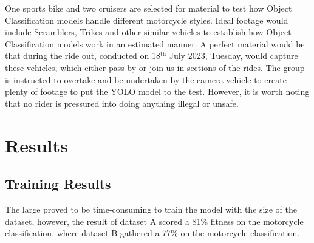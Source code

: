 \documentclass[a0,portrait]{a0poster}
\begin{document}
\begin{multicols}{2}
			One sports bike and two cruisers are selected for material to test how Object Classification models handle different motorcycle styles. Ideal footage would include Scramblers, Trikes and other similar vehicles to establish how Object Classification models work in an estimated manner. A perfect material would be that during the ride out, conducted on 18$^\text{th}$ July 2023, Tuesday, would capture these vehicles, which either pass by or join us in sections of the rides. The group is instructed to overtake and be undertaken by the camera vehicle to create plenty of footage to put the YOLO model to the test. However, it is worth noting that no rider is pressured into doing anything illegal or unsafe.

	\section*{Results}
		\subsection*{Training Results}
			The large proved to be time-consuming to train the model with the size of the dataset, however, the result of dataset A scored a 81\% fitness on the motorcycle classification, where dataset B gathered a 77\% on the motorcycle classification.


\end{multicols}
\end{document}

